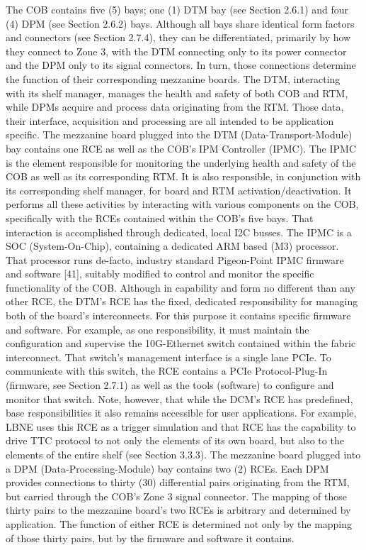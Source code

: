 The COB contains five (5) bays; one (1) DTM bay (see Section 2.6.1) and four (4) DPM (see Section 2.6.2) bays. Although all bays share identical form factors and connectors (see Section 2.7.4), they can be differentiated, primarily by how they connect to Zone 3, with the DTM connecting only to its power connector and the DPM only to its signal connectors. In turn, those connections determine the function of their corresponding mezzanine boards. The DTM, interacting with its shelf manager, manages the health and safety of both COB and RTM, while DPMs acquire and process data originating from the RTM. Those data, their interface, acquisition and processing are all intended to be application specific.
The mezzanine board plugged into the DTM (Data-Transport-Module) bay contains one RCE as well as the COB's IPM Controller (IPMC). The IPMC is the element responsible for monitoring the underlying health and safety of the COB as well as its corresponding RTM. It is also responsible, in conjunction with its corresponding shelf manager, for board and RTM activation/deactivation. It performs all these activities by interacting with various components on the COB, specifically with the RCEs contained within the COB's five bays. That interaction is accomplished through dedicated, local I2C busses. The IPMC is a SOC (System-On-Chip), containing a dedicated ARM based (M3) processor. That processor runs de-facto, industry standard Pigeon-Point IPMC firmware and software [41], suitably modified to control and monitor the specific functionality of the COB.
Although in capability and form no different than any other RCE, the DTM's RCE has the fixed, dedicated responsibility for managing both of the board's interconnects. For this purpose it contains specific firmware and software. For example, as one responsibility, it must maintain the configuration and supervise the 10G-Ethernet switch contained within the fabric interconnect. That switch's management interface is a single lane PCIe. To communicate with this switch, the RCE contains a PCIe Protocol-Plug-In (firmware, see Section 2.7.1) as well as the tools (software) to configure and monitor that switch. Note, however, that while the DCM's RCE has predefined, base responsibilities it also remains accessible for user applications. For example, LBNE uses this RCE as a trigger simulation and that RCE has the capability to drive TTC protocol to not only the elements of its own board, but also to the elements of the entire shelf (see Section 3.3.3).
The mezzanine board plugged into a DPM (Data-Processing-Module) bay contains two (2) RCEs. Each DPM provides connections to thirty (30) differential pairs originating from the RTM, but carried through the COB's Zone 3 signal connector. The mapping of those thirty pairs to the mezzanine board's two RCEs is arbitrary and determined by application. The function of either RCE is determined not only by the mapping of those thirty pairs, but by the firmware and software it contains.
